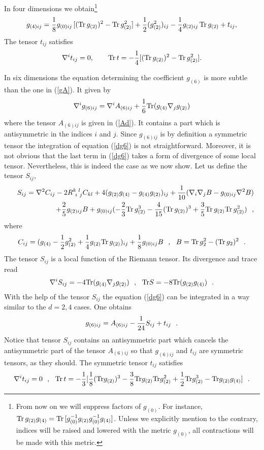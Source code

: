 \documentclass{article}
\def\Tr{{\rm Tr}\, }
\def\be{\begin{equation}}       \def\eq{\begin{equation}}
\def\ee{\end{equation}}         \def\eqe{\end{equation}}
\def\half{{1 \over 2}}
\def\Tr{{\rm Tr}}
\def\half{{1 \over 2}}
\begin{document}
In four dimensions we obtain\footnote{From now on we will suppress 
factors of $g_{(0)}$. For instance,
$\Tr\, g_{(2)} g_{(4)}= \Tr\, [g_{(0)}^{-1}g_{(2)}g_{(0)}^{-1} g_{(4)}]$. 
Unless we explicitly mention to the contrary, indices will be raised and
lowered with the metric $g_{(0)}$, all contractions will 
be made with this metric.}
\be \label{g4}
g_{(4)ij}={1 \over 8} g_{(0)ij} \,[(\Tr\, g_{(2)})^2-\Tr\, g_{(2)}^2] + 
\half (g_{(2)}^2)_{ij} - {1 \over 4} g_{(2)ij}\, \Tr\, g_{(2)}
+t_{ij},
\ee
The tensor $t_{ij}$ satisfies
\be \label{t4}
\nabla^i t_{ij}=0, \qquad \Tr\, t 
= -{1 \over 4} [(\Tr\, g_{(2)})^2 - \Tr\, g_{(2)}^2].
\ee 

In six dimensions  the equation determining the 
coefficient $g_{(6)}$ is more subtle than the one in (\ref{gA}).
It given by
\be \label{dg6}
\nabla^ig_{(6)ij}=\nabla^i A_{(6)ij}
+{1\over 6}\Tr (g_{(4)} \nabla_jg_{(2)})
\ee
where the tensor $A_{(6)ij}$ is given in (\ref{Ad}). It 
contains a part which is antisymmetric in the indices $i$ and $j$. 
Since $g_{(6)ij}$ is by definition a symmetric tensor
the integration of equation (\ref{dg6}) is not straightforward. 
Moreover, it is not obvious that
the last term in (\ref{dg6}) takes a form of divergence of some local tensor. 
Nevertheless, this is indeed the case 
as we now show. Let us define the tensor $S_{ij}$, 
\begin{eqnarray} 
\label{Sij}
&&S_{ij}=\nabla^2C_{ij}-2R^{k \ l}_{\ i \ j} C_{kl}
+4(g_{(2)}g_{(4)}-g_{(4)}g_{(2)})_{ij}
+{1\over 10}(\nabla_i\nabla_jB
-g_{(0)ij}\nabla^2 B) \nonumber \\
&&\hspace{1cm}
+{2\over 5}g_{(2)ij}B+g_{(0)ij}(-{2\over 3}\Tr \, g_{(2)}^3
-{4\over 15}(\Tr \,g_{(2)})^3+
{3\over 5}\Tr \, g_{(2)}\Tr \, g^2_{(2)})~~,
\end{eqnarray}
where 
$$
C_{ij}=(g_{(4)}-{1\over 2}g^2_{(2)}+{1\over 4}g_{(2)}\Tr \,g_{(2)})_{ij}+
{1\over 8}g_{(0)ij}B~~,~~
B=\Tr \, g^2_2-(\Tr \, g_2)^2~~.
$$
The tensor $S_{ij}$ is a local function of the Riemann tensor. Its 
divergence and trace read
\be \label{dtS}
\nabla^iS_{ij}=-4\Tr (g_{(4)} \nabla_j g_{(2)})~~,~~
\Tr S=-8\Tr(g_{(2)}g_{(4)})~~.
\ee
With the help of the tensor $S_{ij}$ the equation (\ref{dg6}) 
can be integrated in a way similar to the $d=2,4$ cases. One obtains
\be \label{g6}
g_{(6)ij}=A_{(6)ij}-{1\over 24}S_{ij} +t_{ij}~~.
\ee
Notice that tensor $S_{ij}$ contains an antisymmetric part which 
cancels the antisymmetric part of
the tensor $A_{(6)ij}$ 
so that $g_{(6)ij}$ and $t_{ij}$ are symmetric tensors, as they should.
The symmetric tensor $t_{ij}$ satisfies 
\be \label{t6}
\nabla^it_{ij}=0~~,~~\Tr\, t =-{1\over 3}[{1\over 8}(\Tr g_{(2)})^3
-{3\over 8}\Tr g_{(2)}\Tr g^2_{(2)}
+{1\over 2}\Tr g^3_{(2)}-\Tr g_{(2)} g_{(4)}]~~.
\ee
\end{document}
